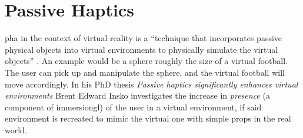 \section{Passive Haptics}

\Gls{pha} in the context of virtual reality is a \enquote{technique that incorporates passive physical objects into virtual environments to physically simulate the virtual objects} \autocite[p. ~9]{passiveHaptics}. An example would be a sphere roughly the size of a virtual football. The user can pick up and manipulate the sphere, and the virtual football will move accordingly. In his PhD thesis \textit{Passive haptics significantly enhances virtual environments} Brent Edward Insko investigates the increase in \textit{presence} (a component of \gls{immersiongl}) of the user in a virtual environment, if said environment is recreated to mimic the virtual one with simple props in the real world.
\newline

\begin{figure}[h]
    \centering
    \hfill
    \hfill
    \caption{}
    \label{fig:passiveHapticsPics}
\end{figure}

